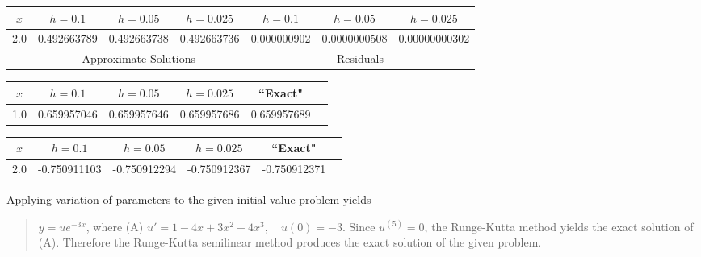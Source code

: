 {\small
\begin{tabular}{|c|r|r|r|r|r|r|}\hline
\multicolumn{1}{|c|}{$x$}&
\multicolumn{1}{|c|}{$h=0.1$}&
\multicolumn{1}{|c|}{$h=0.05$}&
\multicolumn{1}{|c|}{$h=0.025$}&
\multicolumn{1}{|c|}{$h=0.1$}&
\multicolumn{1}{|c|}{$h=0.05$}&
\multicolumn{1}{|c|}{$h=0.025$}\\ \hline
2.0 & 0.492663789 & 0.492663738 & 0.492663736 & 0.000000902 &  0.0000000508 &   0.00000000302 \\
\hline
&\multicolumn{3}{c|}{Approximate Solutions}&
\multicolumn{3}{c|}{Residuals}\\\hline
\end{tabular}}\bigskip

{\small
\begin{tabular}{|c|r|r|r|r|r|}
\hline
\multicolumn{1}{|c|}{$x$}&
\multicolumn{1}{|c|}{$h=0.1$}&
\multicolumn{1}{|c|}{$h=0.05$}&
\multicolumn{1}{|c|}{$h=0.025$}&
\multicolumn{1}{|c|}{``Exact"}\\ \hline
1.0 & 0.659957046 & 0.659957646 & 0.659957686 & 0.659957689 \\
\hline
\end{tabular}}\bigskip

{\small
\begin{tabular}{|c|r|r|r|r|r|}
\hline
\multicolumn{1}{|c|}{$x$}&
\multicolumn{1}{|c|}{$h=0.1$}&
\multicolumn{1}{|c|}{$h=0.05$}&
\multicolumn{1}{|c|}{$h=0.025$}&
\multicolumn{1}{|c|}{``Exact"}\\ \hline
2.0 & -0.750911103 & -0.750912294 & -0.750912367 & -0.750912371 \\
\hline
\end{tabular}}\bigskip

Applying variation of  parameters to the  given initial value  problem
yields
\begin{quote} $y=ue^{-3x}$,  where  (A)  $u'=1-4x+3x^{2}-4x^{3},\quad
u(0)=-3$.
Since $u^{(5)}=0$, the Runge-Kutta  method yields the exact  solution
of  (A).  Therefore  the  Runge-Kutta  semilinear  method produces the exact
solution of the given problem. \end{quote}

